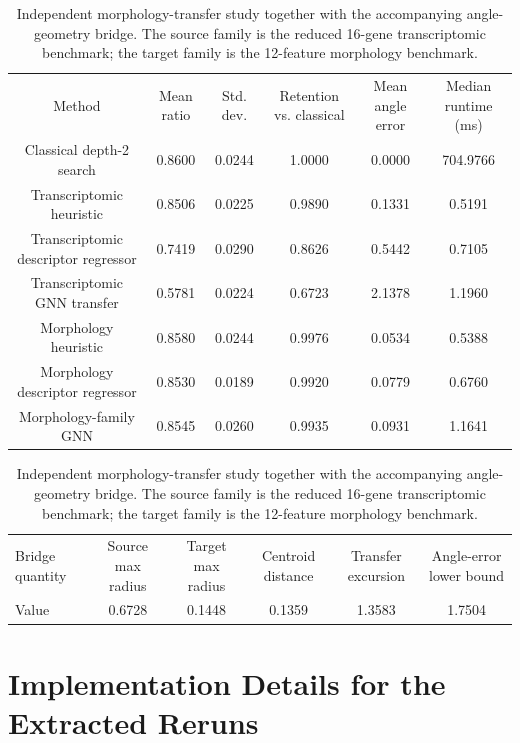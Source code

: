 \documentclass[
  reprint,
  twocolumn,
  aps,
  superscriptaddress,
  longbibliography,
  floatfix
]{revtex4-2}
\begin{document}
\begin{table}[t]
\caption{Independent morphology-transfer study together with the accompanying angle-geometry bridge. The source family is the reduced 16-gene transcriptomic benchmark; the target family is the 12-feature morphology benchmark.}
\label{tab:morphology-transfer-summary}
\begin{ruledtabular}
\begin{tabular}{cccccc}
Method & Mean ratio & Std. dev. & Retention vs. classical & Mean angle error & Median runtime (ms) \\
\colrule
Classical depth-2 search & 0.8600 & 0.0244 & 1.0000 & 0.0000 & 704.9766 \\
Transcriptomic heuristic & 0.8506 & 0.0225 & 0.9890 & 0.1331 & 0.5191 \\
Transcriptomic descriptor regressor & 0.7419 & 0.0290 & 0.8626 & 0.5442 & 0.7105 \\
Transcriptomic GNN transfer & 0.5781 & 0.0224 & 0.6723 & 2.1378 & 1.1960 \\
Morphology heuristic & 0.8580 & 0.0244 & 0.9976 & 0.0534 & 0.5388 \\
Morphology descriptor regressor & 0.8530 & 0.0189 & 0.9920 & 0.0779 & 0.6760 \\
Morphology-family GNN & 0.8545 & 0.0260 & 0.9935 & 0.0931 & 1.1641 \\
\end{tabular}
\end{ruledtabular}
\vspace{1ex}
\begin{ruledtabular}
\begin{tabular}{lccccc}
Bridge quantity & Source max radius & Target max radius & Centroid distance & Transfer excursion & Angle-error lower bound \\
\colrule
Value & 0.6728 & 0.1448 & 0.1359 & 1.3583 & 1.7504 \\
\end{tabular}
\end{ruledtabular}
\end{table}

\section{Implementation Details for the Extracted Reruns}
\end{document}
